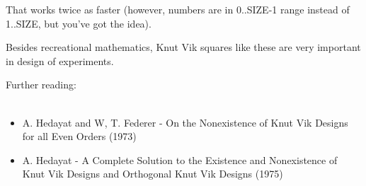 That works twice as faster (however, numbers are in 0..SIZE-1 range instead of 1..SIZE, but you've got the idea).

Besides recreational mathematics, Knut Vik squares like these are very important in design of experiments.

Further reading:\\
\\
\begin{itemize}
\item A. Hedayat and W, T. Federer - On the Nonexistence of Knut Vik Designs for all Even Orders (1973)

\item A. Hedayat - A Complete Solution to the Existence and Nonexistence of Knut Vik Designs and Orthogonal Knut Vik Designs (1975)
\end{itemize}

